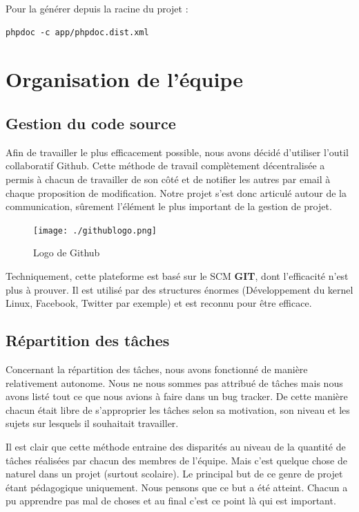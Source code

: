 \documentclass{report}
\begin{document}
      Pour la générer depuis la racine du projet : 
      \begin{verbatim}phpdoc -c app/phpdoc.dist.xml\end{verbatim}    
  \clearpage
  
  \chapter{Organisation de l'équipe}
    \section{Gestion du code source}
      Afin de travailler le plus efficacement possible, nous avons décidé d'utiliser l'outil 
    collaboratif Github. Cette méthode de travail complètement décentralisée
    a permis à chacun de travailler de son côté et
    de notifier les autres par email à chaque proposition de modification.
    Notre projet s'est donc articulé autour de la communication, sûrement l'élément
    le plus important de la gestion de projet.
    
    \begin{figure}[h]
    \begin{center}
        \texttt{[image: ./githublogo.png]}
        \caption{Logo de Github}
        \end{center}
    \end{figure}
    
    Techniquement, cette plateforme est basé sur le SCM \textbf{GIT}, dont
    l'efficacité n'est plus à prouver. Il est utilisé par des structures énormes
    (Développement du kernel Linux, Facebook, Twitter par exemple) et est reconnu 
    pour être efficace.
      
    \section{Répartition des tâches}
  	  Concernant la répartition des tâches, nous avons fonctionné de manière
   relativement autonome. Nous ne nous sommes pas attribué de tâches
   mais nous avons listé tout ce que nous avions à faire dans un bug tracker.
   De cette manière chacun était libre de s'approprier les tâches selon sa 
   motivation, son niveau et les sujets sur lesquels il souhaitait travailler.
     
     Il est clair que cette méthode entraine des disparités au niveau de la quantité
   de tâches réalisées par chacun des membres de l'équipe. Mais c'est quelque 
   chose de naturel dans un projet (surtout scolaire). Le principal but de ce
   genre de projet étant pédagogique uniquement. Nous pensons que ce but a été
   atteint. Chacun a pu apprendre pas mal de choses et au final c'est ce
   point là qui est important.
  
\end{document}
